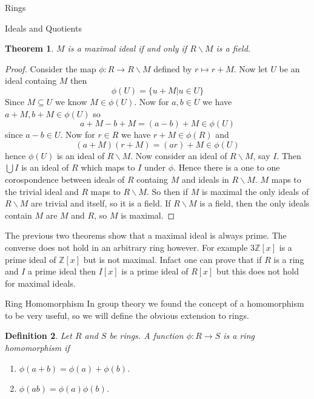 \documentclass[11pt]{report}
\newcommand{\Z}{\mathbb{Z}}
\newcommand{\B }{\backslash}
\theoremstyle{break}
\newtheorem{thm}{Theorem}[section]
\newtheorem{defn}[thm]{Definition}
\begin{document}
\begin{chapter}{Rings}
\begin{section}{Ideals and Quotients}
    
    \begin{thm}
        $M$ is a maximal ideal if and only if $R\B M$ is a field. 
    \end{thm}

    
    \begin{proof}
        Consider the map $\phi: R \to R\B M$ defined by 
        $r \mapsto r+ M$. Now let $U$ be an ideal containg $M$ then 
        \[\phi(U) = \{u + M| u \in U\} \] 
         Since $M \subseteq U$ we know $M \in \phi(U)$. Now for $a, b \in U$ we have $a + M, b + M \in \phi(U)$ so 
         \[a + M - b + M = (a -b )+ M \in \phi(U)\]
         since $a-b \in U$. Now for $r \in R$ we have $r + M \in \phi(R)$ and 
         \[(a + M)(r + M) = (ar) + M \in \phi(U)\]
         hence $\phi(U)$ is an ideal of $R \B M$. 
         Now consider an ideal of $R \B M$, say $I$. Then $\bigcup I$ is an ideal of $R$ which maps to 
         $I$ under $\phi$. Hence there is a one to one corospondence between ideals of $R$ containg $M$ and 
         ideals in $R \B M$. $M$ maps to the trivial ideal and $R$ maps to $R \B M$. So then if $M$ is maximal 
         the only ideals of $R \B M$ are trivial and itself, so it is a field. If $R \B M$ is a field, then 
         the only ideals contain $M$ are $M$ and $R$, so $M$ is maximal. 

    \end{proof}

    The previous two theorems show that a maximal ideal is always prime. The converse does not hold in an arbitrary ring however. 
    For example $3\Z[x]$ is a prime ideal of $\Z[x]$ but is not maximal. Infact one can prove that if $R$ is a ring and $I$ a prime ideal 
    then $I[x]$ is a prime ideal of $R[x]$ but this does not hold for maximal ideals. 

    
\end{section}


\begin{section}{Ring Homomorphism}
    In group theory we found the concept of a homomorphism to be very useful, so we will define the obvious extension to rings. 

    
    \begin{defn}
        Let $R$ and $S$ be rings. A function $\phi: R \to S$ is a ring homomorphism if 
        
        \begin{enumerate}
            \item $\phi(a + b) = \phi(a) + \phi(b)$. 
            \item $\phi(ab) = \phi(a)\phi(b)$. 
        \end{enumerate}
    \end{defn}


\end{section}
\end{chapter}
\end{document}
